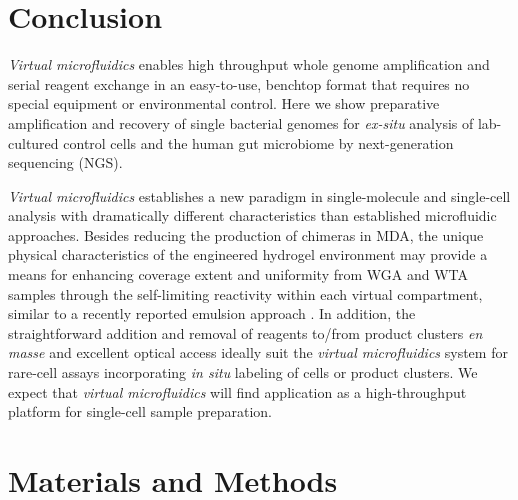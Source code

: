 \section{Conclusion}
\textit{Virtual microfluidics} enables high throughput whole genome amplification and serial reagent exchange in an easy-to-use, benchtop format that requires no special equipment or environmental control. Here we show preparative amplification and recovery of single bacterial genomes for \textit{ex-situ} analysis of lab-cultured control cells and the human gut microbiome by next-generation sequencing (NGS).

\textit{Virtual microfluidics} establishes a new paradigm in single-molecule and single-cell analysis with dramatically different characteristics than established microfluidic approaches. Besides reducing the production of chimeras in MDA, the unique physical characteristics of the engineered hydrogel environment may provide a means for enhancing coverage extent and uniformity from WGA and WTA samples through the self-limiting reactivity within each virtual compartment, similar to a recently reported emulsion approach \cite{Fu:2015gl}. In addition, the straightforward addition and removal of reagents to/from product clusters \textit{en masse} and excellent optical access ideally suit the \textit{virtual microfluidics} system for rare-cell assays incorporating \textit{in situ} labeling of cells or product clusters. We expect that \textit{virtual microfluidics} will find application as a high-throughput platform for single-cell sample preparation.


\section{Materials and Methods}
